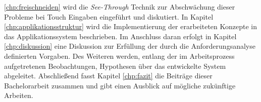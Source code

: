 \ref{chp:freischneiden} wird die \emph{See-Through} Technik zur Abschwächung dieser Probleme bei Touch Eingaben eingeführt und diskutiert. In Kapitel \ref{chp:applikationsstruktur} wird die Implementierung der erarbeiteten Konzepte in das Applikationssystem beschrieben. Im Anschluss daran erfolgt in Kapitel \ref{chp:diskussion} eine Diskussion zur Erfüllung der durch die Anforderungsanalyse definierten Vorgaben. Des Weiteren werden, entlang der im Arbeitsprozess aufgetretenen Beobachtungen, Hypothesen über das entwickelte System abgeleitet. Abschließend fasst Kapitel \ref{chp:fazit} die Beiträge dieser Bachelorarbeit zusammen und gibt einen Ausblick auf mögliche zukünftige Arbeiten.